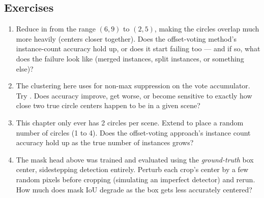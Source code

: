 \subsection*{Exercises}
\begin{enumerate}
  \item Reduce  in  from the range $(6,9)$ to $(2,5)$, making the circles overlap much more heavily (centers closer together). Does the offset-voting method's instance-count accuracy hold up, or does it start failing too --- and if so, what does the failure look like (merged instances, split instances, or something else)?
  \item The clustering here uses  for non-max suppression on the vote accumulator. Try . Does accuracy improve, get worse, or become sensitive to exactly how close two true circle centers happen to be in a given scene?
  \item This chapter only ever has 2 circles per scene. Extend  to place a random number of circles (1 to 4). Does the offset-voting approach's instance count accuracy hold up as the true number of instances grows?
  \item The mask head above was trained and evaluated using the \emph{ground-truth} box center, sidestepping detection entirely. Perturb each crop's center by a few random pixels before cropping (simulating an imperfect detector) and rerun. How much does mask IoU degrade as the box gets less accurately centered?
\end{enumerate}

\vfill
{}
